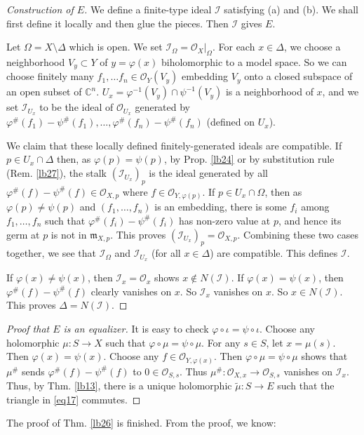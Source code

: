 \documentclass[12pt,b5paper,notitlepage]{report}
\theoremstyle{definition}
\theoremstyle{plain}
\newcommand{\fk}{\mathfrak}
\newcommand{\mc}{\mathcal}
\newcommand{\wtd}{\widetilde}
\newcommand{\scr}{\mathscr}
\newcommand{\Cbb}{\mathbb C}
\numberwithin{equation}{section}
\begin{document}
\begin{proof}[Construction of $E$]
We define a finite-type ideal $\mc I$ satisfying (a) and (b). We shall first define it locally and then glue the pieces. Then $\mc I$ gives $E$.

Let $\Omega=X\setminus \Delta$ which is open.  We set $\mc I_\Omega=\scr O_X|_\Omega$. For each $x\in \Delta$, we choose a neighborhood $V_y\subset Y$ of $y=\varphi(x)$ biholomorphic to a model space. So we can choose finitely many $f_1,\dots f_n\in\scr O_Y(V_y)$ embedding $V_y$ onto a closed subspace of an open subset of $\Cbb^n$. $U_x=\varphi^{-1}(V_y)\cap \psi^{-1}(V_y)$ is a neighborhood of $x$, and we set $\mc I_{U_x}$ to be the ideal of $\scr O_{U_x}$ generated by $\varphi^\#(f_1)-\psi^\#(f_1),\dots,\varphi^\#(f_n)-\psi^\#(f_n)$ (defined on $U_x$).

We claim that these locally defined finitely-generated ideals are compatible. If $p\in U_x\cap \Delta$ then, as $\varphi(p)=\psi(p)$, by Prop. \ref{lb24} or by substitution rule (Rem. \ref{lb27}), the stalk $(\mc I_{U_x})_p$ is the ideal generated by all $\varphi^\#(f)-\psi^\#(f)\in\scr O_{X,p}$ where $f\in\scr O_{Y,\varphi(p)}$. If $p\in U_x\cap\Omega$, then as $\varphi(p)\neq\psi(p)$ and $(f_1,\dots,f_n)$ is an embedding, there is some $f_i$ among $f_1,\dots,f_n$ such that $\varphi^\#(f_i)-\psi^\#(f_i)$ has non-zero value at $p$, and hence its germ at $p$ is not in $\fk m_{X,p}$. This proves $(\mc I_{U_x})_p=\scr O_{X,p}$. Combining these two cases together, we see that $\mc I_\Omega$ and $\mc I_{U_x}$ (for all $x\in\Delta$) are compatible. This defines $\mc I$.

If $\varphi(x)\neq\psi(x)$, then $\mc I_x=\scr O_x$ shows $x\notin N(\mc I)$. If $\varphi(x)=\psi(x)$, then $\varphi^\#(f)-\psi^\#(f)$ clearly vanishes on $x$. So $\mc I_x$ vanishes on $x$. So $x\in N(\mc I)$. This proves $\Delta=N(\mc I)$.
\end{proof}



\begin{proof}[Proof that $E$ is an equalizer]
It is easy to check $\varphi\circ\iota=\psi\circ\iota$. Choose any holomorphic $\mu:S\rightarrow X$ such that $\varphi\circ\mu=\psi\circ\mu$. For any $s\in S$, let $x=\mu(s)$. Then $\varphi(x)=\psi(x)$. Choose any $f\in\scr O_{Y,\varphi(x)}$. Then $\varphi\circ\mu=\psi\circ\mu$ shows that $\mu^\#$ sends $\varphi^\#(f)-\psi^\#(f)$ to $0\in\scr O_{S,s}$. Thus $\mu^\#:\scr O_{X,x}\rightarrow\scr O_{S,s}$ vanishes on $\mc I_x$. Thus, by Thm. \ref{lb13}, there is a unique holomorphic $\wtd\mu:S\rightarrow E$ such that the triangle in \eqref{eq17} commutes.
\end{proof}
The proof of Thm. \ref{lb26} is finished. From the proof, we know:
\end{document}
